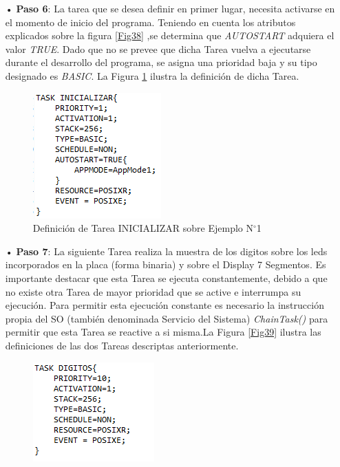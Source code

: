 \documentclass[12pt,letterpaper]{article}
\begin{document}
\begin{enumerate}
\item[•]\textbf{Paso 6}: La tarea que se desea definir en primer lugar, necesita activarse en el momento de inicio del programa. Teniendo en cuenta los atributos explicados sobre la figura \ref{Fig38} ,se determina que \textit{AUTOSTART} adquiera el valor \textit{TRUE}. Dado que no se prevee que dicha Tarea vuelva a ejecutarse durante el desarrollo del programa, se asigna una prioridad baja y su tipo designado es \textit{BASIC}. La Figura \ref{inicializar} ilustra la definición de dicha Tarea.
\begin{figure}[H]
\centering
\includegraphics[width=4 cm]{figuras/f47.png}
\caption{Definición de Tarea INICIALIZAR sobre Ejemplo N$^{\circ}$1}
\label{inicializar}
\end{figure}
\item[•]\textbf{Paso 7}: La siguiente Tarea realiza la muestra de los digitos sobre los leds incorporados en la placa (forma binaria) y sobre el Display 7 Segmentos. Es importante destacar que esta Tarea se ejecuta constantemente, debido a que no existe otra Tarea de mayor prioridad que se active e interrumpa su ejecución. Para permitir esta ejecución constante es necesario la instrucción propia del SO (también denominada Servicio del Sistema) \textit{ChainTask()} para permitir que esta Tarea se reactive a si misma.La Figura \ref{Fig39} ilustra las definiciones de las dos Tareas descriptas anteriormente.
\begin{figure}[H]
\centering
\includegraphics[width=8 cm]{figuras/f22.png}

\end{figure}
\end{enumerate}
\end{document}
